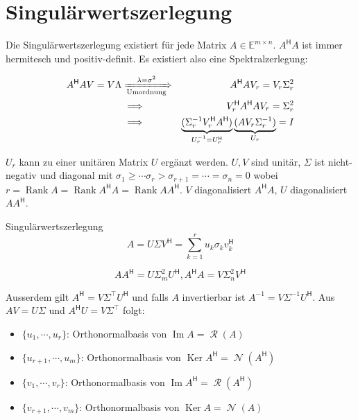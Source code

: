 \documentclass[a4paper,10pt]{article}
\DeclareMathOperator{\Rank}{Rank}
\DeclareMathOperator{\Image}{Im}
\DeclareMathOperator{\Columnspace}{\mathcal{R}}
\DeclareMathOperator{\Nullspace}{\mathcal{N}}
\DeclareMathOperator{\Kernel}{Ker}
\newcommand*{\hermconj}{\mathsf{H}}
\def\E{\mathbb{E}}
\begin{document}
\section{Singulärwertszerlegung}

Die Singulärwertszerlegung existiert für jede Matrix $A \in \E^{m \times n}$. $A^\hermconj A$ ist immer hermitesch und positiv-definit. Es existiert also eine Spektralzerlegung:

\begin{align*}
  A^\hermconj A V = V \Lambda & \xRightarrow[\text{Umordnung}]{\lambda = \sigma^2} & A^\hermconj A V_r = V_r \Sigma_r^2\\
  & \implies & V_r^\hermconj A^\hermconj A V_r = \Sigma_r^2\\
  & \implies & \underbrace{(\Sigma_r^{-1} V_r^\hermconj A^\hermconj)}_{U_r^{-1} = U_r^\hermconj} \underbrace{(A V_r \Sigma_r^{-1})}_{U_r} = I\\
\end{align*}

$U_r$ kann zu einer unitären Matrix $U$ ergänzt werden. $U, V$ sind unitär, $\Sigma$ ist nicht-negativ und diagonal mit $\sigma_1 \geq \cdots \sigma_r > \sigma_{r+1} = \cdots = \sigma_n = 0$ wobei $r = \Rank A = \Rank A^\hermconj A = \Rank A A^\hermconj$. $V$ diagonalisiert $A^\hermconj A$, $U$ diagonalisiert $A A^\hermconj$.

\begin{mainbox}{Singulärwertszerlegung}
  $$A = U \Sigma V^\hermconj = \sum_{k=1}^r u_k \sigma_k v_k^\hermconj$$
\end{mainbox}

$$AA^\hermconj = U \Sigma_m^2 U^\hermconj, A^\hermconj A = V \Sigma_n^2 V^\hermconj$$

Ausserdem gilt $A^\hermconj = V \Sigma^\top U^\hermconj$ und falls $A$ invertierbar ist $A^{-1} = V \Sigma^{-1} U^\hermconj$. Aus $AV = U \Sigma$ und $A^\hermconj U = V \Sigma^\top$ folgt:

\begin{itemize}
  \item $\{u_1, \cdots, u_r\}$: Orthonormalbasis von $\Image A = \Columnspace(A)$
  \item $\{u_{r+1}, \cdots, u_m\}$: Orthonormalbasis von $\Kernel A^\hermconj = \Nullspace(A^\hermconj)$
  \item $\{v_1, \cdots, v_r\}$: Orthonormalbasis von $\Image A^\hermconj = \Columnspace(A^\hermconj)$
  \item $\{v_{r+1}, \cdots, v_m\}$: Orthonormalbasis von $\Kernel A = \Nullspace(A)$
\end{itemize}
\end{document}
